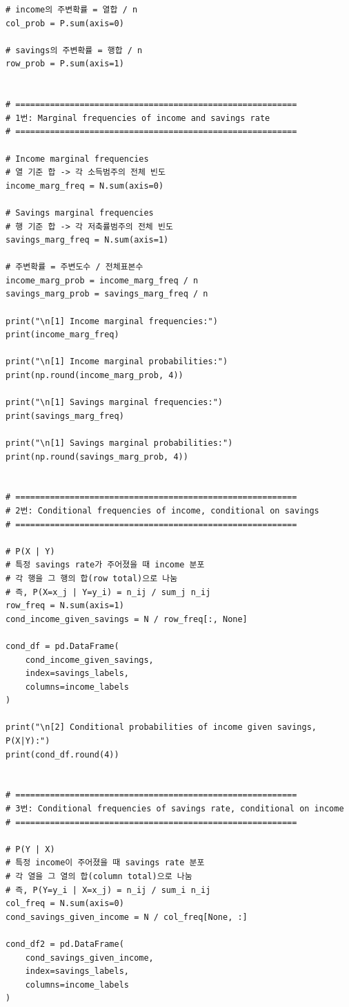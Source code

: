 \documentclass[12pt]{article}
\begin{document}
\begin{lstlisting}
# income의 주변확률 = 열합 / n
col_prob = P.sum(axis=0)

# savings의 주변확률 = 행합 / n
row_prob = P.sum(axis=1)


# =========================================================
# 1번: Marginal frequencies of income and savings rate
# =========================================================

# Income marginal frequencies
# 열 기준 합 -> 각 소득범주의 전체 빈도
income_marg_freq = N.sum(axis=0)

# Savings marginal frequencies
# 행 기준 합 -> 각 저축률범주의 전체 빈도
savings_marg_freq = N.sum(axis=1)

# 주변확률 = 주변도수 / 전체표본수
income_marg_prob = income_marg_freq / n
savings_marg_prob = savings_marg_freq / n

print("\n[1] Income marginal frequencies:")
print(income_marg_freq)

print("\n[1] Income marginal probabilities:")
print(np.round(income_marg_prob, 4))

print("\n[1] Savings marginal frequencies:")
print(savings_marg_freq)

print("\n[1] Savings marginal probabilities:")
print(np.round(savings_marg_prob, 4))


# =========================================================
# 2번: Conditional frequencies of income, conditional on savings
# =========================================================

# P(X | Y)
# 특정 savings rate가 주어졌을 때 income 분포
# 각 행을 그 행의 합(row total)으로 나눔
# 즉, P(X=x_j | Y=y_i) = n_ij / sum_j n_ij
row_freq = N.sum(axis=1)
cond_income_given_savings = N / row_freq[:, None]

cond_df = pd.DataFrame(
    cond_income_given_savings,
    index=savings_labels,
    columns=income_labels
)

print("\n[2] Conditional probabilities of income given savings, P(X|Y):")
print(cond_df.round(4))


# =========================================================
# 3번: Conditional frequencies of savings rate, conditional on income
# =========================================================

# P(Y | X)
# 특정 income이 주어졌을 때 savings rate 분포
# 각 열을 그 열의 합(column total)으로 나눔
# 즉, P(Y=y_i | X=x_j) = n_ij / sum_i n_ij
col_freq = N.sum(axis=0)
cond_savings_given_income = N / col_freq[None, :]

cond_df2 = pd.DataFrame(
    cond_savings_given_income,
    index=savings_labels,
    columns=income_labels
)


\end{lstlisting}
\end{document}
